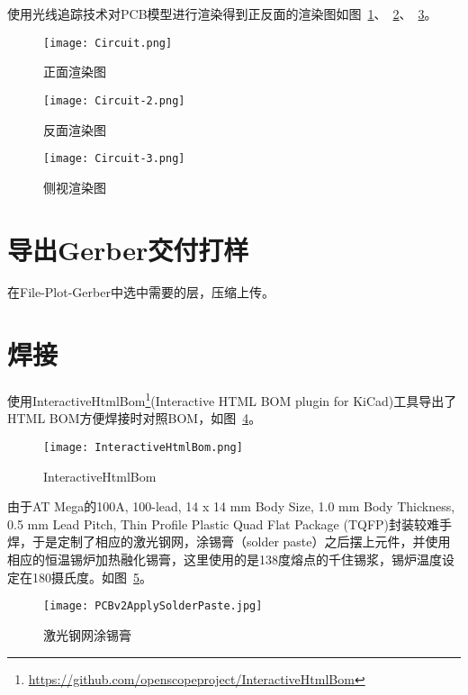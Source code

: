 使用光线追踪技术对PCB模型进行渲染得到正反面的渲染图如图~\ref{fig:Circuit-Render}、~\ref{fig:Circuit-Render-2}、~\ref{fig:Circuit-Render-3}。

\begin{figure}[htbp]
    \centering
    \texttt{[image: Circuit.png]}
    \caption{正面渲染图}
    \label{fig:Circuit-Render}
\end{figure}

\begin{figure}[htbp]
    \centering
    \texttt{[image: Circuit-2.png]}
    \caption{反面渲染图}
    \label{fig:Circuit-Render-2}
\end{figure}

\begin{figure}[htbp]
    \centering
    \texttt{[image: Circuit-3.png]}
    \caption{侧视渲染图}
    \label{fig:Circuit-Render-3}
\end{figure}

\section{导出Gerber交付打样}

在File-Plot-Gerber中选中需要的层，压缩上传。

\section{焊接}

使用InteractiveHtmlBom\footnote{\url{https://github.com/openscopeproject/InteractiveHtmlBom}}(Interactive HTML BOM plugin for KiCad)工具导出了HTML BOM方便焊接时对照BOM，如图~\ref{fig:InteractiveHtmlBom}。

\begin{figure}[htbp]
    \centering
    \texttt{[image: InteractiveHtmlBom.png]}
    \caption{InteractiveHtmlBom}
    \label{fig:InteractiveHtmlBom}
\end{figure}

由于AT Mega的100A, 100-lead, 14 x 14 mm Body Size, 1.0 mm Body Thickness, 0.5 mm Lead Pitch, Thin Profile Plastic Quad Flat Package (TQFP)封装较难手焊，于是定制了相应的激光钢网，涂锡膏（solder paste）之后摆上元件，并使用相应的恒温锡炉加热融化锡膏，这里使用的是138度熔点的千住锡浆，锡炉温度设定在180摄氏度。如图~\ref{fig:ApplySolderPaste}。

\begin{figure}[htbp]
    \centering
    \texttt{[image: PCBv2ApplySolderPaste.jpg]}
    \caption{激光钢网涂锡膏}
    \label{fig:ApplySolderPaste}
\end{figure}

